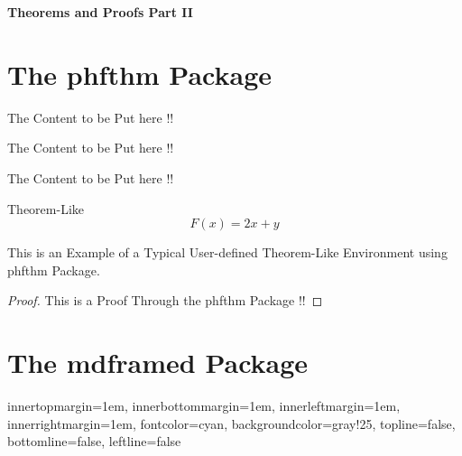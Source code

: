 \documentclass{article}
\begin{document}
	{ \centering
	  \Huge
	  \textbf{Theorems and Proofs Part II}
	}
	
	\vspace{2cm}
	
	\section{The phfthm Package}
	\begin{theorem}
		The Content to be Put here !!
	\end{theorem}
	\begin{question}
		The Content to be Put here !!
	\end{question}
	\begin{corollary*}
		The Content to be Put here !!
	\end{corollary*} 
	
	\begin{thmheading}{Theorem-Like}
		\begin{equation}
			F(x) = 2x + y
		\end{equation}
	\end{thmheading}
	
	\begin{answer}
		This is an Example of a Typical User-defined 			Theorem-Like Environment using phfthm Package.
	\end{answer}
	
	\begin{proof}
		This is a Proof Through the phfthm Package !!
	\end{proof}
	
	\pagebreak
	
	\section{The mdframed Package}
								
	\begin{mdframed}[style=mymdfStyle]
		\lipsum[1]
	\end{mdframed}
	
	{
												{
						innertopmargin=1em,
						innerbottommargin=1em,
						innerleftmargin=1em,
						innerrightmargin=1em,
						fontcolor=cyan,
						backgroundcolor=gray!25,
						topline=false,
						bottomline=false,
						leftline=false}
						
	\begin{mdframed}[style=mymdfStyle,
					 frametitle={Lorem Ipsum Text:},
					 frametitlerule=true,
					 frametitlerulewidth=2pt,
					 frametitleaboveskip=0.4cm,
					 frametitlebelowskip=0.4cm]
		\lipsum[1]
	\end{mdframed}	
	}
	
\end{document}
